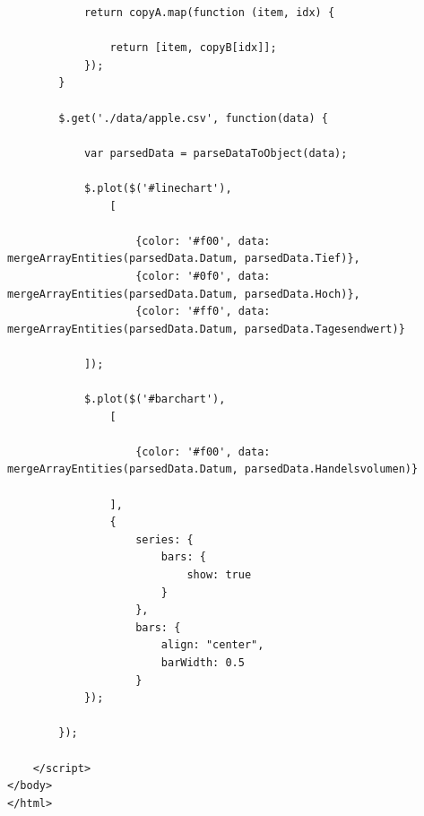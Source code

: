 \begin{itemize}
\begin{lstlisting}
			return copyA.map(function (item, idx) {

				return [item, copyB[idx]];
			});
		}

		$.get('./data/apple.csv', function(data) {

			var parsedData = parseDataToObject(data);
			
			$.plot($('#linechart'), 
				[

					{color: '#f00', data: mergeArrayEntities(parsedData.Datum, parsedData.Tief)},
					{color: '#0f0', data: mergeArrayEntities(parsedData.Datum, parsedData.Hoch)},
					{color: '#ff0', data: mergeArrayEntities(parsedData.Datum, parsedData.Tagesendwert)}

			]);

			$.plot($('#barchart'), 
				[

					{color: '#f00', data: mergeArrayEntities(parsedData.Datum, parsedData.Handelsvolumen)}

				], 
				{
		            series: {
		                bars: {
		                    show: true
		                }
		            },
		            bars: {
		                align: "center",
		                barWidth: 0.5
		            }
			});

		});

	</script>
</body>
</html>

\end{lstlisting}


\end{itemize}





